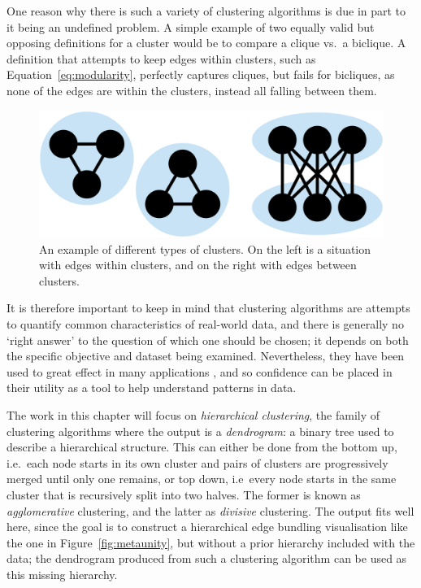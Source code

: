 One reason why there is such a variety of clustering algorithms is due in part to it being an undefined problem. A simple example of two equally valid but opposing definitions for a cluster would be to compare a clique vs.\ a biclique. A definition that attempts to keep edges within clusters, such as Equation~\ref{eq:modularity}, perfectly captures cliques, but fails for bicliques, as none of the edges are within the clusters, instead all falling between them.
\begin{figure}
  \centering
  \includegraphics[width=.8\textwidth]{power/clique_vs_biclique.pdf}
  \caption[Two examples for why clustering is difficult to define]{An example of different types of clusters. On the left is a situation with edges within clusters, and on the right with edges between clusters.}
  \label{fig:clique_vs_biclique}
\end{figure}
It is therefore important to keep in mind that clustering algorithms are attempts to quantify common characteristics of real-world data, and there is generally no `right answer' to the question of which one should be chosen; it depends on both the specific objective and dataset being examined. 
Nevertheless, they have been used to great effect in many applications \cite{Fortunato2016}, and so confidence can be placed in their utility as a tool to help understand patterns in data.

The work in this chapter will focus on \emph{hierarchical clustering}, the family of clustering algorithms where the output is a \textit{dendrogram}: a binary tree used to describe a hierarchical structure.
This can either be done from the bottom up, i.e.\ each node starts in its own cluster and pairs of clusters are progressively merged until only one remains, or top down, i.e\ every node starts in the same cluster that is recursively split into two halves. The former is known as \emph{agglomerative} clustering, and the latter as \emph{divisive} clustering.
The output fits well here, since the goal is to construct a hierarchical edge bundling visualisation like the one in Figure~\ref{fig:metaunity}, but without a prior hierarchy included with the data; the dendrogram produced from such a clustering algorithm can be used as this missing hierarchy.


